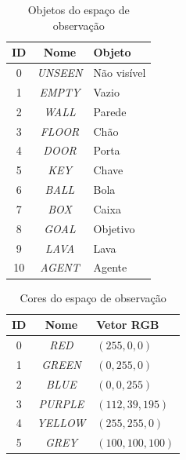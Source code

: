 \documentclass[9pt,a4paper,twoside]{tau}
\begin{document}
\begin{table}[htbp]
    \caption{Objetos do espaço de observação}
    \label{tab:objects}
    \centering
    \begin{tabular}{ccl}
        \toprule
        \textbf{ID} & \textbf{Nome}   & \textbf{Objeto} \\
        \midrule
        0           & \textit{UNSEEN} & Não visível     \\
        1           & \textit{EMPTY}  & Vazio           \\
        2           & \textit{WALL}   & Parede          \\
        3           & \textit{FLOOR}  & Chão            \\
        4           & \textit{DOOR}   & Porta           \\
        5           & \textit{KEY}    & Chave           \\
        6           & \textit{BALL}   & Bola            \\
        7           & \textit{BOX}    & Caixa           \\
        8           & \textit{GOAL}   & Objetivo        \\
        9           & \textit{LAVA}   & Lava            \\
        10          & \textit{AGENT}  & Agente          \\
        \bottomrule
    \end{tabular}
\end{table}

\begin{table}[htbp]
    \caption{Cores do espaço de observação}
    \label{tab:colors}
    \centering
    \begin{tabular}{ccl}
        \toprule
        \textbf{ID} & \textbf{Nome}   & \textbf{Vetor RGB}  \\
        \midrule
        0           & \textit{RED}    & \((255, 0, 0)\)     \\
        1           & \textit{GREEN}  & \((0, 255, 0)\)     \\
        2           & \textit{BLUE}   & \((0, 0, 255)\)     \\
        3           & \textit{PURPLE} & \((112, 39, 195)\)  \\
        4           & \textit{YELLOW} & \((255, 255, 0)\)   \\
        5           & \textit{GREY}   & \((100, 100, 100)\) \\
        \bottomrule
    \end{tabular}
\end{table}
\end{document}
